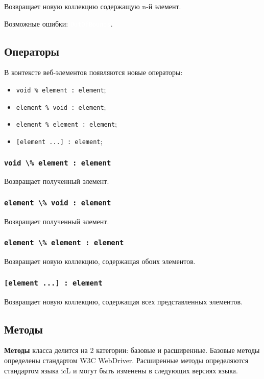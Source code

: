 \documentclass[a4paper, 14pt]{extarticle}
\newcommand{\ferror}[1]{{\fontsize{11pt}{12pt} \tt \colorbox{function}{\textcolor{white}{#1}}}}
\newenvironment{icItems}
	{ \begin{itemize} [noitemsep,nolistsep] }
	{ \end{itemize} }
\begin{document}
Возвращает новую коллекцию содержащую n-й элемент.

Возможные ошибки: \ferror{OutOfBounds}.

\subsection{Операторы}

В контексте веб-элементов появляются новые операторы:
\begin{icItems}
	\item \lstinline|void % element : element|;
	\item \lstinline|element % void : element|;
	\item \lstinline|element % element : element|;
	\item \lstinline|[element ...] : element|;
\end{icItems}

\subsubsection{\lstinline|void \% element : element|}

Возвращает полученный элемент.

\subsubsection{\lstinline|element \% void : element|}

Возвращает полученный элемент.

\subsubsection{\lstinline|element \% element : element|}

Возвращает новую коллекцию, содержащая обоих элементов.

\subsubsection{\lstinline|[element ...] : element|}

Возвращает новую коллекцию, содержащая всех представленных элементов.

\subsection{Методы}

{\bf Методы} класса  делится на 2 категории: базовые и расширенные. Базовые методы определены стандартом W3C WebDriver. Расширенные методы определяются стандартом языка icL и могут быть изменены в следующих версиях языка.
\end{document}
